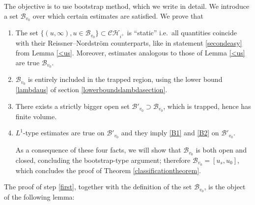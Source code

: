 \documentclass[10pt,a4paper]{article}
\theoremstyle{plain}
\theoremstyle{remark}
\theoremstyle{definition}
\theoremstyle{plain}
\theoremstyle{remark}
\theoremstyle{definition}
\newcommand{\CH}{\mathcal{CH}_{i^+}}
\numberwithin{equation}{section}
\begin{document}
The objective is to use  bootstrap method, which we write in detail. We introduce a set $\mathcal{B}_{v_0}$ over which certain estimates are satisfied. We prove that \begin{enumerate}
	\item \label{first} The set $ \{ (u,\infty), u \in \mathcal{B}_{v_0}  \}\subset \CH$ is ``static'' i.e.\ all quantities coincide with their Reissner--Nordstr\"{o}m counterparts, like in  statement \ref{secondeasy} from Lemma \ref{<us}. Moreover, estimates analogous to those  of Lemma \ref{<us} are true $\mathcal{B}_{v_0}$.
	
	
	
	\item \label{third} $\mathcal{B}_{v_0}$ is entirely included in the trapped region, using the lower bound \eqref{lambdaus} of section \ref{lowerboundslambdasection}.
	
	\item \label{fourth} There exists a strictly bigger open set $\mathcal{B}'_{v_0}\supset \mathcal{B}_{v_0}$, which is trapped, hence has finite volume.
	\item \label{fifth} $L^1$-type estimates are true on $\mathcal{B}'_{v_0}$ and they imply \eqref{B1} and \eqref{B2} on $\mathcal{B}'_{v_0}$.
	
	As a consequence of these four facts, we will show that $\mathcal{B}_{v_0}$ is both open and closed, concluding the bootstrap-type argument; therefore $\mathcal{B}_{v_0}=[u_s,u_0]$, which concludes the proof of Theorem \ref{classificationtheorem}.
\end{enumerate}

The proof of step \ref{first}, together with the definition of the set $\mathcal{B}_{v_0}$, is the object of the following lemma:
\end{document}
